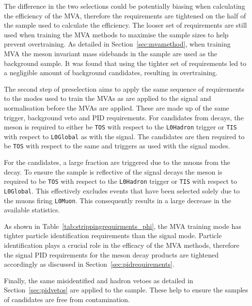 The difference in the two selections could be potentially biasing when calculating the efficiency of the MVA, therefore the requirements are tightened on the half of the \decay{\Bs}{\jpsi\phiz} sample used to calculate the efficiency. The looser set of requirements are still used when training the MVA methods to maximise the sample sizes to help prevent overtraining. As detailed in Section~\ref{sec:mvamethod}, when training MVA the \phiz meson invariant mass sidebands in the \decay{\Bs}{\jpsi\phiz} sample are used as the background sample. It was found that using the tighter set of requirements led to a negligible amount of background candidates, resulting in overtraining. 


The second step of preselection aims to apply the same sequence of requirements to the modes used to train the MVAs as are applied to the signal and normalisation before the MVAs are applied. These are made up of the same trigger, background veto and PID requirements.
For \Dsp candidates from \decay{\Bsb}{\Dsp\pim} decays, the \Bsb meson is required to either be \texttt{TOS} with respect to the \texttt{L0Hadron} trigger or \texttt{TIS} with respect to \texttt{L0Global} as with the signal. The \Bsb candidates are then required to be \texttt{TOS} with respect to the same \hltone and \hlttwo triggers as used with the signal modes.

For the \decay{\Bs}{\jpsi\phiz} candidates, a large fraction are triggered due to the muons from the \jpsi decay. To ensure the sample is reflective of the signal decays the \Bs meson is required to be \texttt{TOS} with respect to the \texttt{L0Hadron} trigger or \texttt{TIS} with respect to \texttt{L0Global}. This effectively excludes events that have been selected solely due to the muons firing \texttt{L0Muon}. This consequently results in a large decrease in the available statistics.

As shown in Table~\ref{tab:strippingrequirments_phi}, the MVA training mode has tighter particle identification requirements than the signal mode. Particle identification plays a crucial role in the efficacy of the MVA methods, therefore the signal PID requirements for the \phiz meson decay products are tightened accordingly as discussed in Section~\ref{sec:pidrequirements}.

Finally, the same misidentified \D and \Lc hadron vetoes as detailed in Section~\ref{sec:pidvetos} are applied to the \decay{\Bsb}{\Dsp\pim} sample. These help to ensure the samples of \Dsp candidates are free from contamination.


